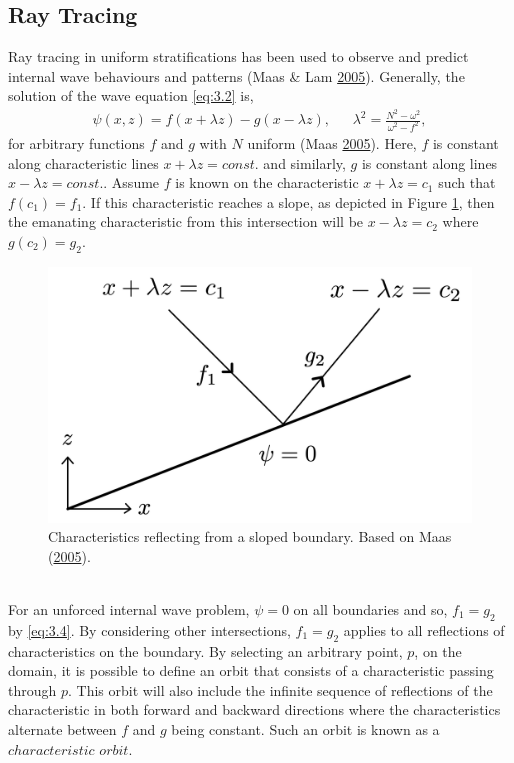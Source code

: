\documentclass[a4paper]{article}
\numberwithin{equation}{section}
\begin{document}
\subsection{Ray Tracing}
Ray tracing in uniform stratifications has been used to observe and predict internal wave behaviours and patterns (Maas \& Lam \hyperlink{ref 10}{2005}). Generally, the solution of the wave equation \eqref{eq:3.2} is, 
\begin{align}\label{eq:3.4}
\psi(x,z) = f(x+\lambda z) - g(x-\lambda z), ~~~~~~~ \lambda^2 = \frac{N^2 - \omega^2}{\omega^2 - f^2},
\end{align}
for arbitrary functions $f$ and $g$ with $N$ uniform (Maas \hyperlink{ref 39}{2005}). Here, $f$ is constant along characteristic lines $x+ \lambda z = const.$ and similarly, $g$ is constant along lines $x- \lambda z = const.$. Assume $f$ is known on the characteristic $x+ \lambda z = c_1$ such that $f(c_1) = f_1$. If this characteristic reaches a slope, as depicted in Figure \ref{fig:3}, then the emanating characteristic from this intersection will be $x- \lambda z = c_2$ where $g(c_2) = g_2$.
\begin{figure}[h!]
  \includegraphics[scale=0.11, center]{Images/rays}
  \caption{Characteristics reflecting from a sloped boundary. Based on Maas (\protect\hyperlink{ref 39}{2005}).}
  \label{fig:3}
\end{figure} \\
For an unforced internal wave problem, $\psi = 0$ on all boundaries and so, $f_1 = g_2$ by \eqref{eq:3.4}. By considering other intersections, $f_1 = g_2$ applies to all reflections of characteristics on the boundary. By selecting an arbitrary point, $p$, on the domain, it is possible to define an orbit that consists of a characteristic passing through $p$. This orbit will also include the infinite sequence of reflections of the characteristic in both forward and backward directions where the characteristics alternate between $f$ and $g$ being constant. Such an orbit is known as a $characteristic$ $orbit$. 
\end{document}
